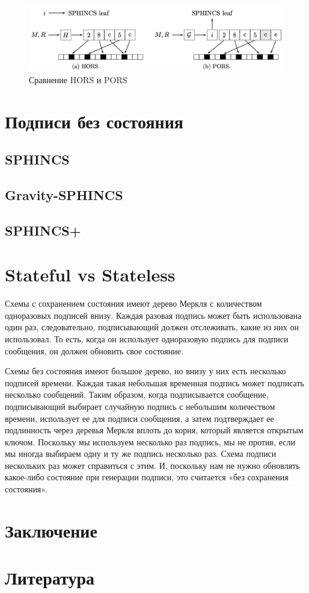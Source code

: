 \documentclass[a4paper, 14pt]{extarticle}
\begin{document}
\begin{figure}[h]
    \centering
    \includegraphics[scale=0.85]{PORS.png}
    \caption{Сравнение HORS и PORS}
\end{figure}
\newpage

\section{Подписи без состояния}
\subsection{SPHINCS}
\subsection{Gravity-SPHINCS}
\subsection{SPHINCS+}

\section{Stateful vs Stateless}
Схемы с сохранением состояния имеют дерево Меркля с количеством одноразовых подписей внизу. Каждая разовая подпись может быть использована один раз, следовательно, подписывающий должен отслеживать, какие из них он использовал. То есть, когда он использует одноразовую подпись для подписи сообщения, он должен обновить свое состояние.

Схемы без состояния имеют большое дерево, но внизу у них есть несколько подписей времени. Каждая такая небольшая временная подпись может подписать несколько сообщений. Таким образом, когда подписывается сообщение, подписывающий выбирает случайную подпись с небольшим количеством времени, использует ее для подписи сообщения, а затем подтверждает ее подлинность через деревья Меркля вплоть до корня, который является открытым ключом. Поскольку мы используем несколько раз подпись, мы не против, если мы иногда выбираем одну и ту же подпись несколько раз. Схема подписи нескольких раз может справиться с этим. И, поскольку нам не нужно обновлять какое-либо состояние при генерации подписи, это считается «без сохранения состояния».
\newpage

\section{Заключение}
\newpage

\section{Литература}
\newpage
\end{document}
